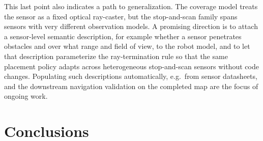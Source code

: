 \documentclass[sensors,article,submit,pdftex,moreauthors]{Definitions/mdpi}
\begin{document}
This last point also indicates a path to generalization. The coverage model
treats the sensor as a fixed optical ray-caster, but the stop-and-scan family
spans sensors with very different observation models. A promising direction is to
attach a sensor-level semantic description, for example whether a sensor
penetrates obstacles and over what range and field of view, to the robot model,
and to let that description parameterize the ray-termination rule so that the same
placement policy adapts across heterogeneous stop-and-scan sensors without code
changes. Populating such descriptions automatically, e.g.\ from sensor
datasheets, and the downstream navigation validation on the completed map are
the focus of ongoing work.

\section{Conclusions}
\label{sec:conclusions}
\end{document}
